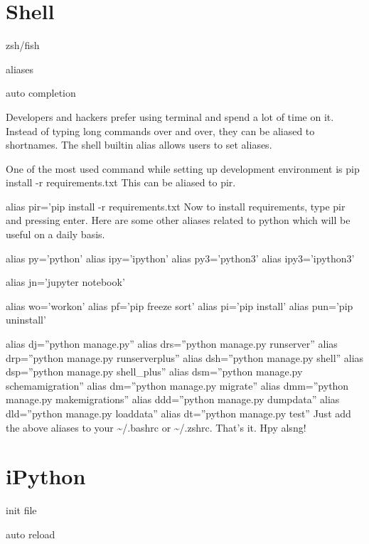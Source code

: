 \documentclass[letterpaper,11pt,english]{sphinxmanual}
\begin{document}
\section{Shell}
\label{\detokenize{appendix:shell}}
zsh/fish

aliases

auto completion

Developers and hackers prefer using terminal and spend a lot of time on it. Instead of typing long commands over and over, they can be aliased to shortnames. The shell builtin alias allows users to set aliases.

One of the most used command while setting up development environment is pip install -r requirements.txt This can be aliased to pir.

alias pir=’pip install -r requirements.txt
Now to install requirements, type pir and pressing enter. Here are some other aliases related to python which will be useful on a daily basis.

alias py=’python’
alias ipy=’ipython’
alias py3=’python3’
alias ipy3=’ipython3’

alias jn=’jupyter notebook’

alias wo=’workon’
alias pf=’pip freeze \textbar{} sort’
alias pi=’pip install’
alias pun=’pip uninstall’

alias dj=”python manage.py”
alias drs=”python manage.py runserver”
alias drp=”python manage.py runserverplus”
alias dsh=”python manage.py shell”
alias dsp=”python manage.py shell\_plus”
alias dsm=”python manage.py schemamigration”
alias dm=”python manage.py migrate”
alias dmm=”python manage.py makemigrations”
alias ddd=”python manage.py dumpdata”
alias dld=”python manage.py loaddata”
alias dt=”python manage.py test”
Just add the above aliases to your \textasciitilde{}/.bashrc or \textasciitilde{}/.zshrc. That’s it. Hpy alsng!


\section{iPython}
\label{\detokenize{appendix:ipython}}
init file

auto reload



\renewcommand{\indexname}{Index}
\printindex
\end{document}
